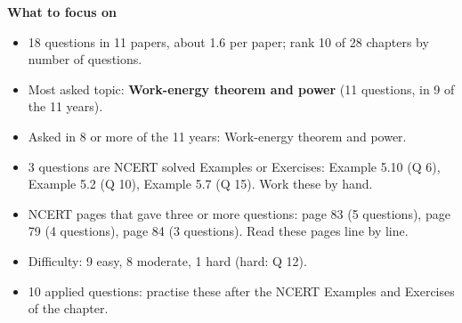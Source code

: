 \begin{minipage}[t]{0.63\linewidth}{\small\textbf{\color{crimson}What to focus on}\par\smallskip
\begin{itemize}[leftmargin=1.1em,itemsep=1pt,topsep=0pt]
\item 18 questions in 11 papers, about 1.6 per paper; rank 10 of 28 chapters by number of questions.
\item Most asked topic: \textbf{Work-energy theorem and power} (11 questions, in 9 of the 11 years).
\item Asked in 8 or more of the 11 years: Work-energy theorem and power.
\item 3 questions are NCERT solved Examples or Exercises: Example 5.10 (Q 6), Example 5.2 (Q 10), Example 5.7 (Q 15). Work these by hand.
\item NCERT pages that gave three or more questions: page 83 (5 questions), page 79 (4 questions), page 84 (3 questions). Read these pages line by line.
\item Difficulty: 9 easy, 8 moderate, 1 hard (hard: Q 12).
\item 10 applied questions: practise these after the NCERT Examples and Exercises of the chapter.
\end{itemize}}\end{minipage}\par
{}
